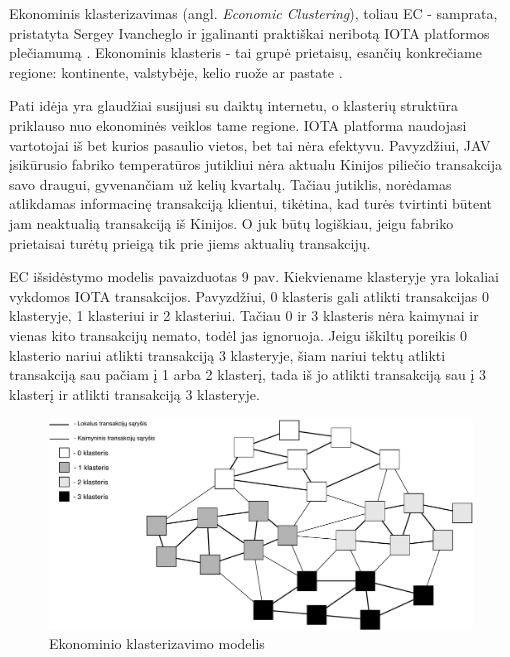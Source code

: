 

Ekonominis klasterizavimas (angl. \textit{Economic Clustering}), toliau EC - samprata, pristatyta Sergey Ivancheglo ir įgalinanti praktiškai neribotą IOTA platformos plečiamumą \cite{sergey2018economic}.
Ekonominis klasteris - tai grupė prietaisų, esančių konkrečiame regione: kontinente, valstybėje, kelio ruože ar pastate \cite{sergey2018economic}. 

Pati idėja yra glaudžiai susijusi su daiktų internetu, o klasterių struktūra priklauso nuo ekonominės veiklos tame regione. IOTA platforma naudojasi vartotojai iš bet kurios pasaulio vietos, bet tai nėra efektyvu. Pavyzdžiui, JAV įsikūrusio fabriko temperatūros jutikliui nėra aktualu Kinijos piliečio transakcija savo draugui, gyvenančiam už kelių kvartalų. Tačiau jutiklis, norėdamas atlikdamas informacinę transakciją klientui, tikėtina, kad turės tvirtinti būtent jam neaktualią transakciją iš Kinijos. O juk būtų logiškiau, jeigu fabriko prietaisai turėtų prieigą tik prie jiems aktualių transakcijų.

EC išsidėstymo modelis pavaizduotas 9 pav. Kiekviename klasteryje yra lokaliai vykdomos IOTA transakcijos. Pavyzdžiui, 0 klasteris gali atlikti transakcijas 0 klasteryje, 1 klasteriui ir 2 klasteriui. Tačiau 0 ir 3 klasteris nėra kaimynai ir vienas kito transakcijų nemato, todėl jas ignoruoja. Jeigu iškiltų poreikis 0 klasterio nariui atlikti transakciją 3 klasteryje, šiam nariui tektų atlikti transakciją sau pačiam į 1 arba 2 klasterį, tada iš jo atlikti transakciją sau į 3 klasterį ir atlikti transakciją 3 klasteryje.

\begin{figure}[H]
    \centering
    \includegraphics[scale=0.7]{images/economic-clusters}
    \caption{Ekonominio klasterizavimo modelis}
\end{figure}

